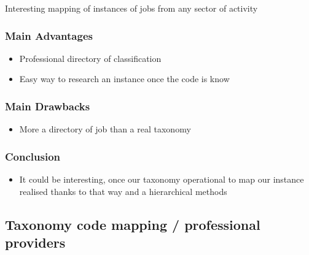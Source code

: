 \documentclass[12pt]{report}
\begin{document}

 \par

\begin{Center}
Interesting mapping of instances of jobs from any sector of activity
\end{Center}\par

\subsubsection*{Main Advantages }
\begin{itemize}
	\item Professional directory of classification\par

	\item Easy way to research an instance once the code is know\par


\end{itemize}\subsubsection*{Main Drawbacks }
\begin{itemize}
	\item More a directory of job than a real taxonomy \par


\end{itemize}\subsubsection*{ Conclusion }
\begin{itemize}
	\item It could be interesting, once our taxonomy operational to map our instance realised thanks to that way and a hierarchical methods\par


\vspace{\baselineskip}

\vspace{\baselineskip}

\end{itemize}\subsection*{Taxonomy code mapping / professional providers }
\end{document}

